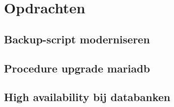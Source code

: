 \section{Opdrachten}
\label{sec:opdrachten}

\subsection{Backup-script moderniseren}

\subsection{Procedure upgrade mariadb}

\subsection{High availability bij databanken}